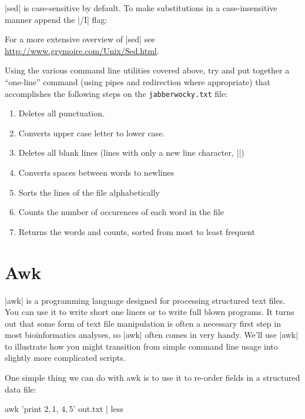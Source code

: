|sed| is case-sensitive by default. To make substitutions in a case-insensitive manner append the |/I| flag:

For a more extensive overview of |sed| see \url{http://www.grymoire.com/Unix/Sed.html}.


\medskip
\begin{inclassassignment}

Using the various command line utilities covered above, try and put together a ``one-line'' command (using pipes and redirection where appropriate) that accomplishes the following steps on the \verb|jabberwocky.txt| file:

\begin{enumerate}
 \item Deletes all punctuation.
 \item Converts upper case letter to lower case.
 \item Deletes all blank lines (lines with only a new line character, |\n|)
 \item Converts spaces between words to newlines
 \item Sorts the lines of the file alphabetically
 \item Counts the number of occurences of each word in the file
 \item Returns the words and counts, sorted from most to least frequent
\end{enumerate}  

\end{inclassassignment}

 
\section{Awk}

|awk| is a programming language designed for processing structured text files. You can use it to write short one liners or to write full blown programs. It turns out that some form of text file manipulation is often a necessary first step in most bioinformatics analyses, so |awk| often comes in very handy.  We'll use |awk| to illustrate how you might transition from simple command line usage into slightly more complicated scripts.

One simple thing we can do with awk is to use it to re-order fields in a structured data file:
\begin{bash}
awk '{print $2, $1, $4, $5}' out.txt | less
\end{bash}

